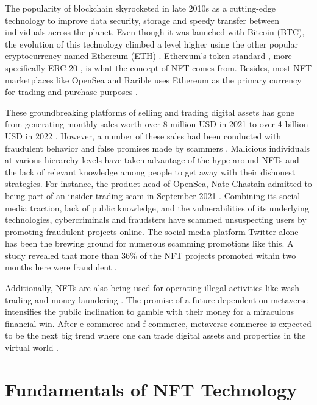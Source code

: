 \documentclass[12pt]{article}
\begin{document}
The popularity of blockchain skyrocketed in late 2010s as a cutting-edge technology to improve data security, storage and speedy transfer between individuals across the planet. Even though it was launched with Bitcoin (BTC), the evolution of this technology climbed a level higher using the other popular cryptocurrency named Ethereum (ETH) \cite{ante2022non}. Ethereum’s token standard \cite{wang2021non}, more specifically ERC-20 \cite{ali2021introduction}, is what the concept of NFT comes from. Besides, most NFT marketplaces like OpenSea and Rarible uses Ethereum as the primary currency for trading and purchase purposes \cite{9869497}. 

These groundbreaking platforms of selling and trading digital assets has gone from generating monthly sales worth over 8 million USD in 2021 to over 4 billion USD in 2022 \cite{mekacher2022heterogeneous}. However, a number of these sales had been conducted with fraudulent behavior and false promises made by scammers \cite{9755212}. Malicious individuals at various hierarchy levels have taken advantage of the hype around NFTs and the lack of relevant knowledge among people to get away with their dishonest strategies. For instance, the product head of OpenSea, Nate Chastain admitted to being part of an insider trading scam in September 2021 \cite{scharfman2023non}. Combining its social media traction, lack of public knowledge, and the vulnerabilities of its underlying technologies, cybercriminals and fraudsters have scammed unsuspecting users by promoting fraudulent projects online. The social media platform Twitter alone has been the brewing ground for numerous scamming promotions like this. A study revealed that more than 36\% of the NFT projects promoted within two months here were fraudulent \cite{roy2023demystifying}. 

Additionally, NFTs are also being used for operating illegal activities like wash trading \cite{vonwachter2022nft} and money laundering \cite{kafteranis2022art}. The promise of a future dependent on metaverse intensifies the public inclination to gamble with their money for a miraculous financial win. After e-commerce and f-commerce, metaverse commerce is expected to be the next big trend where one can trade digital assets and properties in the virtual world \cite{lee2021all}.

\section{Fundamentals of NFT Technology}
\end{document}
